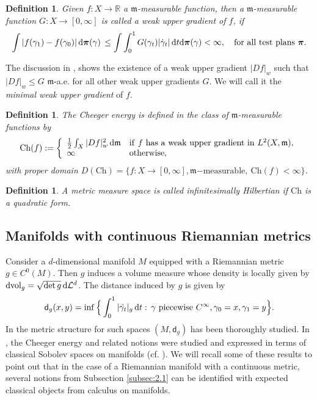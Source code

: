 \documentclass[a4paper,10pt]{article}
\newtheorem{definition}[theorem]{Definition}
\numberwithin{equation}{section}
\newcommand{\R}{\mathbb{R}}
\newcommand{\vol}{\mathrm{vol}}
\newcommand{\Ch}{\mathrm{Ch}}
\newcommand{\sfd}{\mathsf d}
\newcommand{\di}{{\rm d}}
\begin{document}
\begin{definition}
   Given { $f: X \to \R$ } a $\mathfrak{m}$-measurable function, then a $\mathfrak{m}$-measurable function $G: X \to [0, \infty]$ is called a weak upper gradient of $f$, if 
   \begin{align}\label{weakgradient}
       \int|f(\gamma_1)-f(\gamma_0)|\,\di\boldsymbol{\pi}(\gamma)\,  \leq \int\int_0^1G(\gamma_t)|\dot{\gamma}_t|\, \di t\di\boldsymbol{\pi}(\gamma) < \infty, \quad \mathrm{for \ all \ test \ plans } \ \boldsymbol{\pi}. 
   \end{align}
\end{definition}
The discussion in \cite[Proposition 5.9 and Definition 5.11]{ambrosio2014inventio}, shows the existence of a weak upper gradient $|Df|_w$ such that $|Df|_w \leq G$ {$\mathfrak{m}$-a.e.} for all other weak upper gradients $G$. We will call it the \textit{minimal weak upper gradient} of $f$.
\begin{definition}
    The Cheeger energy is defined in the class of $\mathfrak{m}$-measurable functions by
    \begin{align*}
        \Ch(f):= \left\{ \begin{array}{ll}
           \frac{1}{2}\int_X |Df|^2_w\, \di\mathfrak{m}  & \mathrm{if}\ f\ \mathrm{has\ a\ weak\ upper\ gradient\ in }\ L^2(X, \mathfrak{m}),  \\
           \infty  & \mathrm{otherwise},
        \end{array}\right.
    \end{align*}
    with proper domain $D(\Ch)= \{f:X \to [0, \infty], \mathfrak{m}\mathrm{-measurable}, \ \Ch(f) < \infty\}$.
\end{definition}
\begin{definition}
    A metric measure space is called \emph{infinitesimally Hilbertian} if  $\Ch$ is a quadratic form.
\end{definition}
\subsection{Manifolds with continuous Riemannian metrics}\label{subsec:2.2}
Consider a $d$-dimensional manifold $M$ equipped with a Riemannian metric $g \in C^{0}(M)$. Then $g$ induces a volume measure whose density is locally given by $\di\vol_g = \sqrt{\det g}\, \di \mathcal{L}^d$. 
The distance induced by $g$ is given by 
\begin{align}\label{def:dg}
    \sfd_g(x, y) = \inf\Big\{ \int_{0}^1 |\dot{\gamma_t}|_g\, \di t: \, \gamma\ \mathrm{piecewise \ }C^\infty, \gamma_0=x, \gamma_1 = y \Big\}.
\end{align}
In \cite{burtscher2012length} the metric structure for such spaces $(M, \sfd_g)$ has been thoroughly studied. In \cite{mondino2025equivalence}, the Cheeger energy and related notions were studied and expressed in terms of classical Sobolev spaces on manifolds (cf. \cite{hebey1996sobolev}). We will recall some of these results to point out that in the case of a Riemannian manifold with a continuous metric, several notions from Subsection \ref{subsec:2.1} can be identified with expected classical objects from calculus on manifolds. 
\smallskip
\end{document}
